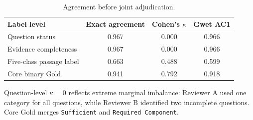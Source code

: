 \begin{table}[htbp]
\centering
\begin{threeparttable}
\caption{Agreement before joint adjudication.}
\label{tab:agreement}
\begin{tabular}{lccc}
\toprule
Label level & Exact agreement & Cohen's $\kappa$ & Gwet AC1 \\
\midrule
Question status & 0.967 & 0.000 & 0.966 \\
Evidence completeness & 0.967 & 0.000 & 0.966 \\
Five-class passage label & 0.663 & 0.488 & 0.599 \\
Core binary Gold & 0.941 & 0.792 & 0.918 \\
\bottomrule
\end{tabular}
\begin{tablenotes}[flushleft]\footnotesize
\item Question-level $\kappa=0$ reflects extreme marginal imbalance: Reviewer A used one category for all questions, while Reviewer B identified two incomplete questions. Core Gold merges \texttt{Sufficient} and \texttt{Required Component}.
\end{tablenotes}
\end{threeparttable}
\end{table}
